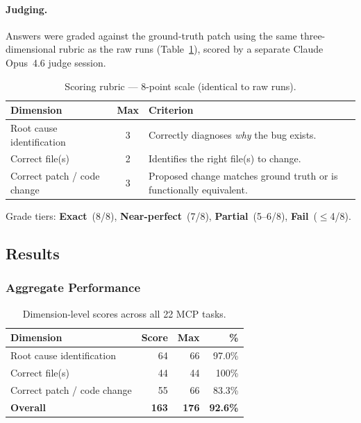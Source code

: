 \paragraph{Judging.}
Answers were graded against the ground-truth patch using the same
three-dimensional rubric as the raw runs (Table~\ref{tab:rubric-mcp}),
scored by a separate Claude Opus~4.6 judge session.

\begin{table}[h]
\centering
\caption{Scoring rubric --- 8-point scale (identical to raw runs).}\label{tab:rubric-mcp}
\begin{tabular}{lcp{8cm}}
\toprule
\textbf{Dimension} & \textbf{Max} & \textbf{Criterion} \\
\midrule
Root cause identification & 3 & Correctly diagnoses \emph{why} the bug exists. \\
Correct file(s)           & 2 & Identifies the right file(s) to change. \\
Correct patch / code change & 3 & Proposed change matches ground truth or is functionally equivalent. \\
\bottomrule
\end{tabular}
\end{table}

\noindent
Grade tiers: \textbf{Exact}~(8/8), \textbf{Near-perfect}~(7/8),
\textbf{Partial}~(5--6/8), \textbf{Fail}~($\le$4/8).

\subsection{Results}

\subsubsection{Aggregate Performance}

\begin{table}[h]
\centering
\caption{Dimension-level scores across all 22 MCP tasks.}\label{tab:dim-mcp}
\begin{tabular}{lrrr}
\toprule
\textbf{Dimension} & \textbf{Score} & \textbf{Max} & \textbf{\%} \\
\midrule
Root cause identification   & 64 & 66 & 97.0\% \\
Correct file(s)             & 44 & 44 & 100\%  \\
Correct patch / code change & 55 & 66 & 83.3\% \\
\midrule
\textbf{Overall}            & \textbf{163} & \textbf{176} & \textbf{92.6\%} \\
\bottomrule
\end{tabular}
\end{table}

